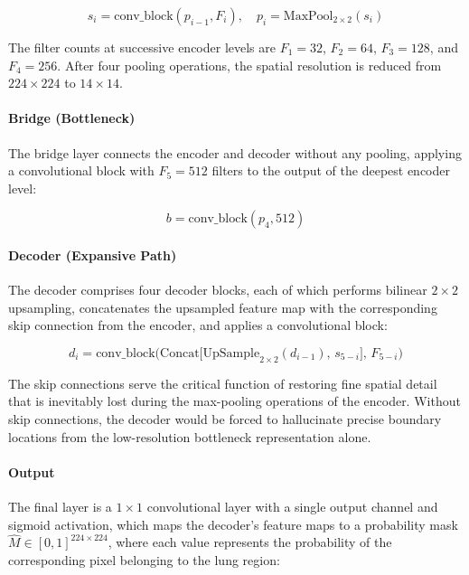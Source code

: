 \begin{equation}
	s_i = \mathrm{conv\_block}(p_{i-1}, F_i), \quad
	p_i = \mathrm{MaxPool}_{2 \times 2}(s_i)
	\label{eq:encoder_block}
\end{equation}

The filter counts at successive encoder levels are $F_1 = 32$, $F_2 = 64$, $F_3 = 128$, and $F_4 = 256$. After four pooling operations, the spatial resolution is reduced from $224 \times 224$ to $14 \times 14$.

\paragraph{Bridge (Bottleneck)}
The bridge layer connects the encoder and decoder without any pooling, applying a convolutional block with $F_5 = 512$ filters to the output of the deepest encoder level:

\begin{equation}
	b = \mathrm{conv\_block}(p_4, 512)
	\label{eq:bridge_layer}
\end{equation}

\paragraph{Decoder (Expansive Path)}
The decoder comprises four decoder blocks, each of which performs bilinear $2 \times 2$ upsampling, concatenates the upsampled feature map with the corresponding skip connection from the encoder, and applies a convolutional block:

\begin{equation}
	d_i =
	\mathrm{conv\_block}\Big(
	\mathrm{Concat}\big[
	\mathrm{UpSample}_{2 \times 2}(d_{i-1}),\, s_{5-i}
	\big],\, F_{5-i}
	\Big)
	\label{eq:decoder_block}
\end{equation}

The skip connections serve the critical function of restoring fine spatial detail that is inevitably lost during the max-pooling operations of the encoder. Without skip connections, the decoder would be forced to hallucinate precise boundary locations from the low-resolution bottleneck representation alone.

\paragraph{Output}
The final layer is a $1 \times 1$ convolutional layer with a single output channel and sigmoid activation, which maps the decoder's feature maps to a probability mask $\hat{M} \in [0,1]^{224 \times 224}$, where each value represents the probability of the corresponding pixel belonging to the lung region:

